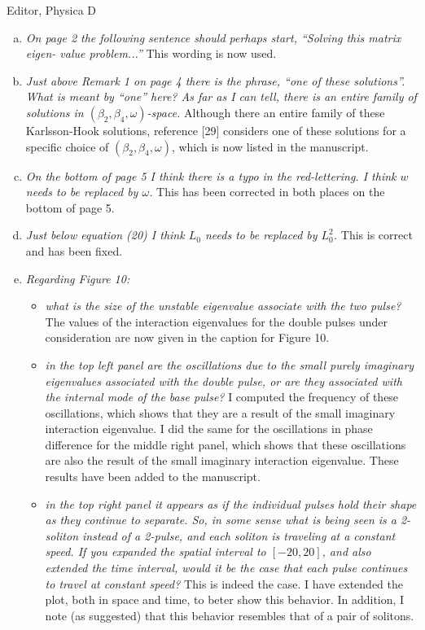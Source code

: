 \documentclass[11pt]{letter}
\begin{document}
\begin{letter}{Editor, Physica D}
\begin{enumerate}[(a)]
\item \emph{On page 2 the following sentence should perhaps start, ``Solving this matrix eigen- value problem...''} This wording is now used.

\item \emph{Just above Remark 1 on page 4 there is the phrase, ``one of these solutions''. What is meant by ``one'' here? As far as I can tell, there is an entire family of solutions in $(\beta_2, \beta_4, \omega)$-space.} Although there an entire family of these Karlsson-Hook solutions, reference [29] considers one of these solutions for a specific choice of $(\beta_2, \beta_4, \omega)$, which is now listed in the manuscript.

\item \emph{On the bottom of page 5 I think there is a typo in the red-lettering. I think $w$ needs to be replaced by $\omega$.} This has been corrected in both places on the bottom of page 5.

\item \emph{Just below equation (20) I think $L_0$ needs to be replaced by $L_0^2$.} This is correct and has been fixed.

\item \emph{Regarding Figure 10:}

\begin{itemize}
\item \emph{what is the size of the unstable eigenvalue associate with the two pulse?} The values of the interaction eigenvalues for the double pulses under consideration are now given in the caption for Figure 10.

\item \emph{in the top left panel are the oscillations due to the small purely imaginary eigenvalues associated with the double pulse, or are they associated with the internal mode of the base pulse?} I computed the frequency of these oscillations, which shows that they are a result of the small imaginary interaction eigenvalue. I did the same for the oscillations in phase difference for the middle right panel, which shows that these oscillations are also the result of the small imaginary interaction eigenvalue. These results have been added to the manuscript.

\item \emph{in the top right panel it appears as if the individual pulses hold their shape as they continue to separate. So, in some sense what is being seen is a 2-soliton instead of a 2-pulse, and each soliton is traveling at a constant speed. If you expanded the spatial interval to $[-20, 20]$, and also extended the time interval, would it be the case that each pulse continues to travel at constant speed?} This is indeed the case. I have extended the plot, both in space and time, to beter show this behavior. In addition, I note (as suggested) that this behavior resembles that of a pair of solitons.


\end{itemize}
\end{enumerate}
\end{letter}
\end{document}

